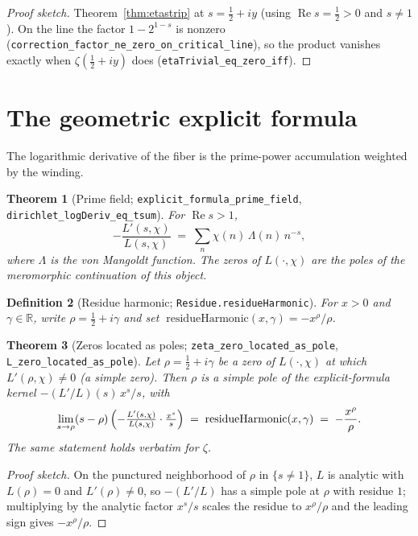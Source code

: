 \documentclass[11pt]{article}
\newtheorem{definition}{Definition}[section]
\newtheorem{theorem}[definition]{Theorem}
\DeclareMathOperator{\Ree}{Re}
\newcommand{\R}{\mathbb{R}}
\newcommand{\code}[1]{\texttt{#1}}
\begin{document}
\begin{proof}[Proof sketch]
Theorem~\ref{thm:etastrip} at $s=\tfrac12+iy$ (using $\Ree s=\tfrac12>0$ and $s\neq1$). On the line
the factor $1-2^{1-s}$ is nonzero (\code{correction\_factor\_ne\_zero\_on\_critical\_line}), so the
product vanishes exactly when $\zeta(\tfrac12+iy)$ does (\code{etaTrivial\_eq\_zero\_iff}).
\end{proof}

\section{The geometric explicit formula}\label{sec:explicit}

The logarithmic derivative of the fiber is the prime-power accumulation weighted by the winding.

\begin{theorem}[Prime field; \code{explicit\_formula\_prime\_field}, \code{dirichlet\_logDeriv\_eq\_tsum}]\label{thm:primefield}
For $\Ree s>1$,
\[
  -\frac{L'(s,\chi)}{L(s,\chi)} \;=\; \sum_{n}\chi(n)\,\Lambda(n)\,n^{-s},
\]
where $\Lambda$ is the von Mangoldt function. The zeros of $L(\cdot,\chi)$ are the poles of the
meromorphic continuation of this object.
\end{theorem}

\begin{definition}[Residue harmonic; \code{Residue.residueHarmonic}]\label{def:resharm}
For $x>0$ and $\gamma\in\R$, write $\rho=\tfrac12+i\gamma$ and set
$\;\mathrm{residueHarmonic}(x,\gamma)=-x^{\rho}/\rho$.
\end{definition}

\begin{theorem}[Zeros located as poles; \code{zeta\_zero\_located\_as\_pole}, \code{L\_zero\_located\_as\_pole}]\label{thm:pole}
Let $\rho=\tfrac12+i\gamma$ be a zero of $L(\cdot,\chi)$ at which $L'(\rho,\chi)\neq 0$ (a simple
zero). Then $\rho$ is a simple pole of the explicit-formula kernel $-(L'/L)(s)\,x^{s}/s$, with
\[
  \lim_{s\to\rho}(s-\rho)\,\Bigl(-\tfrac{L'(s,\chi)}{L(s,\chi)}\cdot\tfrac{x^{s}}{s}\Bigr)
   \;=\; \mathrm{residueHarmonic}(x,\gamma)\;=\;-\frac{x^{\rho}}{\rho}.
\]
The same statement holds verbatim for $\zeta$.
\end{theorem}

\begin{proof}[Proof sketch]
On the punctured neighborhood of $\rho$ in $\{s\neq 1\}$, $L$ is analytic with $L(\rho)=0$ and
$L'(\rho)\neq0$, so $-(L'/L)$ has a simple pole at $\rho$ with residue $1$; multiplying by the
analytic factor $x^{s}/s$ scales the residue to $x^{\rho}/\rho$ and the leading sign gives
$-x^{\rho}/\rho$.
\end{proof}
\end{document}
